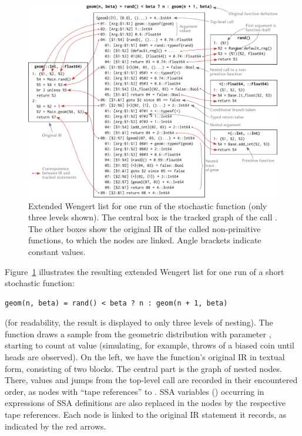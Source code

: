 \begin{figure}[t]
  \centering
  \includegraphics[width=\textwidth]{figures/extended-wengert-list}
  \caption{Extended Wengert list for one run of the stochastic function \protect{} (only
    three levels shown). The central box is the tracked graph of the call \protect{}. The other boxes show the original IR of the called non-primitive functions, to which
    the nodes are linked.  Angle brackets indicate constant values.}
  \label{fig:ext-wengert-list}
\end{figure}

Figure~\ref{fig:ext-wengert-list} illustrates the resulting extended Wengert list for one run of a
short stochastic function:
\begin{lstlisting}
geom(n, beta) = rand() < beta ? n : geom(n + 1, beta)
\end{lstlisting}
(for readability, the result is displayed to only three levels of nesting).  The function draws a
sample from the geometric distribution with parameter , starting to count at value
 (simulating, for example, throws of a biased coin until heads are observed).  On the left,
we have the function's original IR in textual form, consisting of two blocks. The central part is
the graph of nested nodes.  There, values and jumps from the top-level call are recorded in their
encountered order, as nodes with \enquote{tape references}  to . SSA variables
() occurring in expressions of SSA definitions are also replaced in the nodes by the
respective tape references.  Each node is linked to the original IR statement it records, as
indicated by the red arrows.

